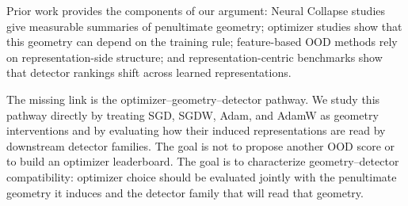 Prior work provides the components of our argument: Neural Collapse studies give
measurable summaries of penultimate geometry; optimizer studies show that this
geometry can depend on the training rule; feature-based OOD methods rely on
representation-side structure; and representation-centric benchmarks show that
detector rankings shift across learned representations.

The missing link is the optimizer--geometry--detector pathway. We study this
pathway directly by treating SGD, SGDW, Adam, and AdamW as geometry interventions
and by evaluating how their induced representations are read by downstream
detector families. The goal is not to propose another OOD score or to build an
optimizer leaderboard. The goal is to characterize geometry--detector
compatibility: optimizer choice should be evaluated jointly with the
penultimate geometry it induces and the detector family that will read that
geometry.
